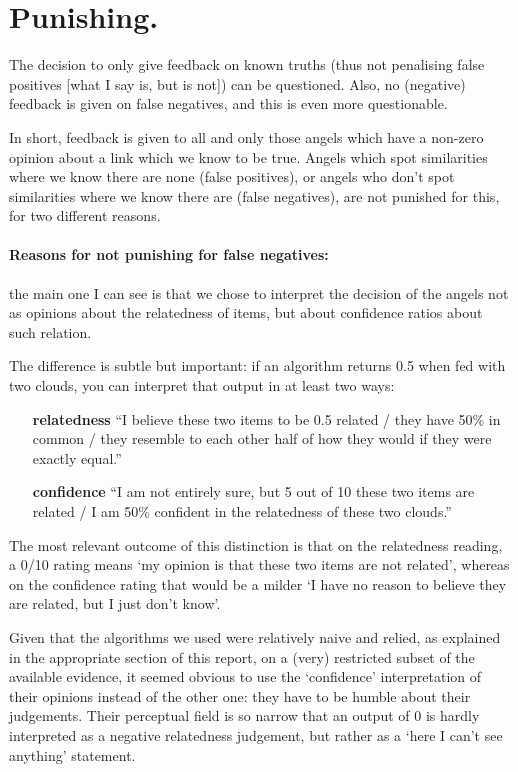 \documentclass[11pt]{article}
\begin{document}
\section{Punishing.}

The decision to only give feedback on known truths (thus not penalising false positives [what I say is, but is not]) can be questioned. Also, no (negative) feedback is given on false negatives, and this is even more questionable.

In short, feedback is given to all and only those angels which have a non-zero opinion about a link which we know to be true. Angels which spot similarities where we know there are none (false positives), or angels who don't spot similarities where we know there are (false negatives), are not punished for this, for two different reasons.

\paragraph{Reasons for not punishing for false negatives:} the main one I can see is that we chose to interpret the decision of the angels not as opinions about the relatedness of items, but about confidence ratios about such relation.

The difference is subtle but important: if an algorithm returns 0.5 when fed with two clouds, you can interpret that output in at least two ways:

\begin{itemize}
\item[\textbf{relatedness}] ``I believe these two items to be 0.5 related / they have 50\% in common / they resemble to each other half of how they would if they were exactly equal.''
\item[\textbf{confidence}] ``I am not entirely sure, but 5 out of 10 these two items are related / I am 50\% confident in the relatedness of these two clouds.''
\end{itemize}

The most relevant outcome of this distinction is that on the relatedness reading, a 0/10 rating means `my opinion is that these two items are not related', whereas on the confidence rating that would be a milder `I have no reason to believe they are related, but I just don't know'.

Given that the algorithms we used were relatively naive and relied, as explained in the appropriate section of this report, on a (very) restricted subset of the available evidence, it seemed obvious to use the `confidence' interpretation of their opinions instead of the other one: they have to be humble about their judgements. Their perceptual field is so narrow that an output of 0 is hardly interpreted as a negative relatedness judgement, but rather as a `here I can't see anything' statement.
\end{document}
